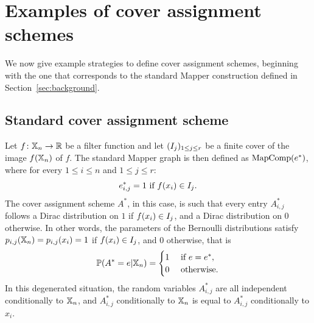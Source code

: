 \section{Examples of cover assignment schemes} \label{sec:examples}

We now give example strategies to define cover assignment schemes, beginning with the one that corresponds to the standard Mapper construction defined in Section~\ref{sec:background}.


\subsection{Standard cover assignment scheme}
\label{sec:stdMapper}


Let $f\colon\mathbb{X}_n \rightarrow \mathbb{R}$ be a filter function  and let $(I_j)_{1\leq j\leq r}$ be a finite cover of the image $f(\mathbb{X}_n)$ of $f$.
The standard Mapper graph is then defined as $\text{MapComp}(e^\ast)$, where for every $1\leq i \leq n$ and 
$1\leq j \leq r$:
$$e^\ast_{i,j}=1 \text{ if } f(x_i)\in I_j.$$ %
The cover assignment scheme $A^\ast$, in this case, is such that every entry $A^\ast_{i,j}$ follows a Dirac distribution on $1$ if $f (x_i)\in I_j$,
and a Dirac distribution on  $0$ otherwise. In other words, the parameters of the Bernoulli distributions satisfy $p_{i,j} (\mathbb{X}_n) = p_{i,j} (x_i) = 1 $ if  $f (x_i)\in I_j$,
and $0$ otherwise, that is
\[
    \mathbb{P}(A^\ast=e | \mathbb{X}_n)= 
\begin{cases}
    1& \text{ if } e=e^\ast ,\\
    0              & \text{ otherwise.}
\end{cases}
\]
In this degenerated situation, the random variables $A^\ast_{i,j}$ are all independent conditionally to $\mathbb{X}_n$, and $A^\ast_{i,j}$ conditionally to $\mathbb{X}_n$ is equal to $A^\ast_{i,j}$ conditionally to $x_i$. 



